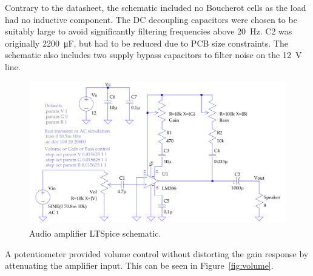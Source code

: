 \documentclass[a4paper,10pt]{article}
\newcommand{\LTSpice}{LTSpice\textsuperscript{\textregistered}\xspace}
\begin{document}
Contrary to the datasheet, the schematic included no Boucherot cells as the load
had no inductive component. The DC decoupling capacitors were chosen to be
suitably large to avoid significantly filtering frequencies above
\SI{20}{\hertz}. C2 was originally \SI{2200}{\micro\farad}, but had to be
reduced due to PCB size constraints. The schematic also includes two supply
bypass capacitors to filter noise on the \SI{12}{\volt} line.

\begin{figure}[h]
	\centering
	\includegraphics[width=\textwidth]{img/spice_circuit.pdf}
	\caption{Audio amplifier \LTSpice schematic.}
	\label{fig:ltspice}
\end{figure}

A potentiometer provided volume control without distorting the gain response by
attenuating the amplifier input. This can be seen in Figure~\ref{fig:volume}.
\end{document}
